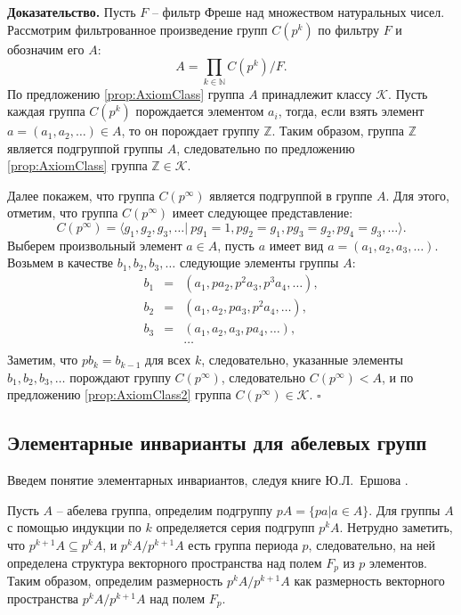 \documentclass[a4paper,11pt,twoside]{article}
\def\K{{\mathcal{K}}}
\def\Z{{\mathbb{Z}}}
\def\N{{\mathbb{N}}}
\begin{document}
{\bf Доказательство.} 
Пусть $F$ -- фильтр Фреше над множеством натуральных чисел. Рассмотрим фильтрованное произведение групп $C(p^k)$ по фильтру $F$ и обозначим его $A$:
$$A = \prod_{k \in \N} C(p^k) \Big/ F.$$ 
По предложению \ref{prop:AxiomClass} группа $A$ принадлежит классу $\K$. 
Пусть каждая группа $C(p^k)$ порождается элементом $a_i$, тогда, если взять элемент $a = (a_1, a_2, \ldots) \in A$, то он порождает группу $\Z$. Таким образом, группа $\Z$ является подгруппой группы $A$, следовательно по предложению \ref{prop:AxiomClass} группа $\Z \in \K$.

Далее покажем, что группа $C(p^\infty)$ является подгруппой в группе $A$. Для этого, отметим, что группа $C(p^\infty)$ имеет следующее представление:
$$C(p^\infty) = \langle g_1, g_2, g_3, \ldots | \ pg_1 = 1, pg_2 = g_1, pg_3 = g_2, pg_4 = g_3, \ldots \rangle.$$
Выберем произвольный элемент $a \in A$, пусть $a$ имеет вид $a = (a_1, a_2, a_3, \ldots )$. Возьмем в качестве $b_1, b_2, b_3, \ldots$ следующие элементы группы $A$:
$$\begin{array}{ccl}
b_1 & = & (a_1, pa_2, p^2a_3, p^3a_4, \ldots), \\
b_2 & = & (a_1, a_2, pa_3, p^2a_4, \ldots), \\
b_3 & = & (a_1, a_2, a_3, pa_4, \ldots), \\
&  & \ldots \\
\end{array}$$
Заметим, что $pb_k = b_{k-1}$ для всех $k$, следовательно, указанные элементы $b_1, b_2, b_3, \ldots$ порождают группу $C(p^\infty)$, следовательно $C(p^\infty) < A$, и по предложению \ref{prop:AxiomClass2} группа $C(p^\infty) \in \K$. $\square$ 


\subsection{Элементарные инварианты для абелевых групп}

Введем понятие элементарных инвариантов, следуя книге Ю.Л.~Ершова \cite{Ershov}.

Пусть $A$ -- абелева группа, определим подгруппу $pA = \{ pa | a \in A\}$. Для группы $A$ с помощью индукции по $k$ определяется серия подгрупп $p^k A$. Нетрудно заметить, что $p^{k+1} A \subseteq p^k A$, и $p^k A \Big/ p^{k+1} A$ есть группа периода $p$, следовательно, на ней определена структура векторного пространства над полем $F_p$ из $p$ элементов. Таким образом, определим размерность $p^k A \Big/ p^{k+1} A$ как размерность векторного пространства $p^k A \Big/ p^{k+1} A$ над полем $F_p$.
\end{document}

